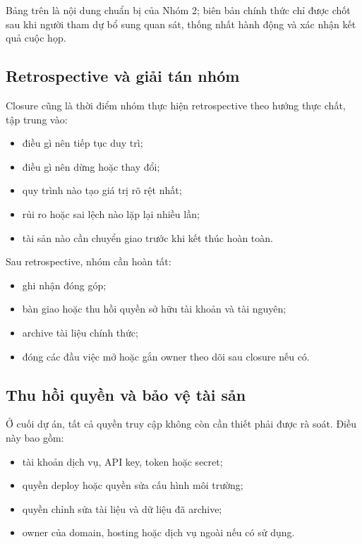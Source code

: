 Bảng trên là nội dung chuẩn bị của Nhóm 2; biên bản chính thức chỉ được chốt sau khi người tham dự bổ sung quan sát, thống nhất hành động và xác nhận kết quả cuộc họp.

\iffalse
\subsection{Retrospective và giải tán nhóm}

Closure cũng là thời điểm nhóm thực hiện retrospective theo hướng thực chất, tập trung vào:

\begin{itemize}
  \item điều gì nên tiếp tục duy trì;
  \item điều gì nên dừng hoặc thay đổi;
  \item quy trình nào tạo giá trị rõ rệt nhất;
  \item rủi ro hoặc sai lệch nào lặp lại nhiều lần;
  \item tài sản nào cần chuyển giao trước khi kết thúc hoàn toàn.
\end{itemize}

Sau retrospective, nhóm cần hoàn tất:

\begin{itemize}
  \item ghi nhận đóng góp;
  \item bàn giao hoặc thu hồi quyền sở hữu tài khoản và tài nguyên;
  \item archive tài liệu chính thức;
  \item đóng các đầu việc mở hoặc gắn owner theo dõi sau closure nếu có.
\end{itemize}

\subsection{Thu hồi quyền và bảo vệ tài sản}

Ở cuối dự án, tất cả quyền truy cập không còn cần thiết phải được rà soát. Điều này bao gồm:

\begin{itemize}
  \item tài khoản dịch vụ, API key, token hoặc secret;
  \item quyền deploy hoặc quyền sửa cấu hình môi trường;
  \item quyền chỉnh sửa tài liệu và dữ liệu đã archive;
  \item owner của domain, hosting hoặc dịch vụ ngoài nếu có sử dụng.
\end{itemize}

